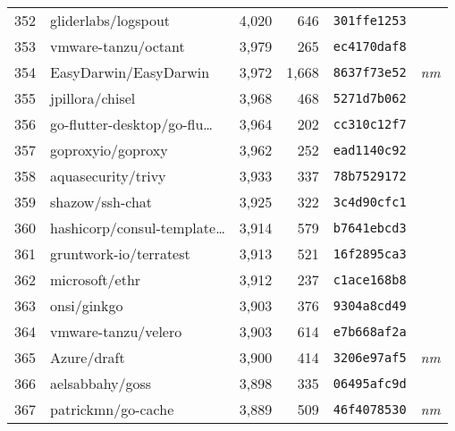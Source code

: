 {\begin{supertabular}{llrrll}
        352 &                gliderlabs/logspout &  4,020 &    646 &  \texttt{301ffe1253} &              \\
        353 &                vmware-tanzu/octant &  3,979 &    265 &  \texttt{ec4170daf8} &              \\
        354 &              EasyDarwin/EasyDarwin &  3,972 &  1,668 &  \texttt{8637f73e52} &  \textit{nm} \\
        355 &                    jpillora/chisel &  3,968 &    468 &  \texttt{5271d7b062} &              \\
        356 &    go-flutter-desktop/go-flu\ldots &  3,964 &    202 &  \texttt{cc310c12f7} &              \\
        357 &                  goproxyio/goproxy &  3,962 &    252 &  \texttt{ead1140c92} &              \\
        358 &                 aquasecurity/trivy &  3,933 &    337 &  \texttt{78b7529172} &              \\
        359 &                    shazow/ssh-chat &  3,925 &    322 &  \texttt{3c4d90cfc1} &              \\
        360 &    hashicorp/consul-template\ldots &  3,914 &    579 &  \texttt{b7641ebcd3} &              \\
        361 &             gruntwork-io/terratest &  3,913 &    521 &  \texttt{16f2895ca3} &              \\
        362 &                     microsoft/ethr &  3,912 &    237 &  \texttt{c1ace168b8} &              \\
        363 &                        onsi/ginkgo &  3,903 &    376 &  \texttt{9304a8cd49} &              \\
        364 &                vmware-tanzu/velero &  3,903 &    614 &  \texttt{e7b668af2a} &              \\
        365 &                        Azure/draft &  3,900 &    414 &  \texttt{3206e97af5} &  \textit{nm} \\
        366 &                    aelsabbahy/goss &  3,898 &    335 &  \texttt{06495afc9d} &              \\
        367 &                 patrickmn/go-cache &  3,889 &    509 &  \texttt{46f4078530} &  \textit{nm} \\

\end{supertabular}}
